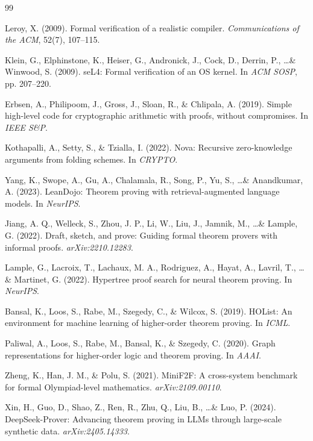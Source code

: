 \documentclass[11pt]{article}
\begin{document}

\begin{thebibliography}{99}

Leroy, X. (2009). Formal verification of a realistic compiler. \textit{Communications of the ACM}, 52(7), 107--115.

Klein, G., Elphinstone, K., Heiser, G., Andronick, J., Cock, D., Derrin, P., \ldots \& Winwood, S. (2009). seL4: Formal verification of an OS kernel. In \textit{ACM SOSP}, pp. 207--220.

Erbsen, A., Philipoom, J., Gross, J., Sloan, R., \& Chlipala, A. (2019). Simple high-level code for cryptographic arithmetic with proofs, without compromises. In \textit{IEEE S\&P}.

Kothapalli, A., Setty, S., \& Tzialla, I. (2022). Nova: Recursive zero-knowledge arguments from folding schemes. In \textit{CRYPTO}.

Yang, K., Swope, A., Gu, A., Chalamala, R., Song, P., Yu, S., \ldots \& Anandkumar, A. (2023). LeanDojo: Theorem proving with retrieval-augmented language models. In \textit{NeurIPS}.

Jiang, A. Q., Welleck, S., Zhou, J. P., Li, W., Liu, J., Jamnik, M., \ldots \& Lample, G. (2022). Draft, sketch, and prove: Guiding formal theorem provers with informal proofs. \textit{arXiv:2210.12283}.

Lample, G., Lacroix, T., Lachaux, M. A., Rodriguez, A., Hayat, A., Lavril, T., \ldots \& Martinet, G. (2022). Hypertree proof search for neural theorem proving. In \textit{NeurIPS}.

Bansal, K., Loos, S., Rabe, M., Szegedy, C., \& Wilcox, S. (2019). HOList: An environment for machine learning of higher-order theorem proving. In \textit{ICML}.

Paliwal, A., Loos, S., Rabe, M., Bansal, K., \& Szegedy, C. (2020). Graph representations for higher-order logic and theorem proving. In \textit{AAAI}.

Zheng, K., Han, J. M., \& Polu, S. (2021). MiniF2F: A cross-system benchmark for formal Olympiad-level mathematics. \textit{arXiv:2109.00110}.

Xin, H., Guo, D., Shao, Z., Ren, R., Zhu, Q., Liu, B., \ldots \& Luo, P. (2024). DeepSeek-Prover: Advancing theorem proving in LLMs through large-scale synthetic data. \textit{arXiv:2405.14333}.


\end{thebibliography}
\end{document}
